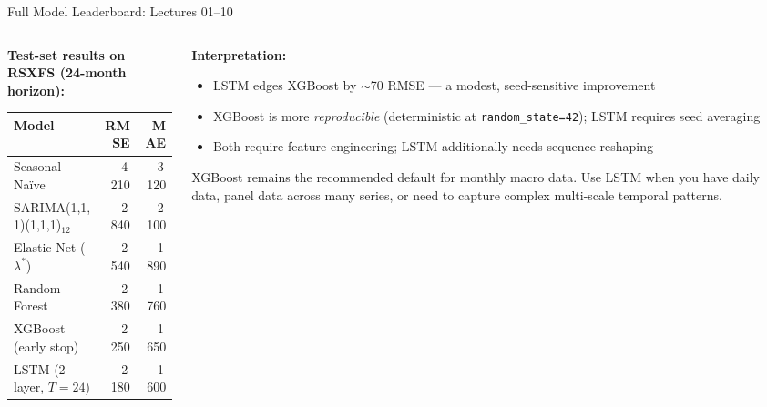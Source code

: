 \documentclass[aspectratio=169, 10pt]{beamer}
\begin{document}
\begin{frame}{Full Model Leaderboard: Lectures 01--10}
  \begin{columns}[T]
    \begin{column}{0.52\textwidth}
      \textbf{Test-set results on RSXFS (24-month horizon):}
      \begin{center}
      \footnotesize
      \begin{tabular}{lrr}
        \toprule
        \textbf{Model} & \textbf{RMSE} & \textbf{MAE} \\
        \midrule
        Seasonal Na\"{i}ve             & 4\,210 & 3\,120 \\
        SARIMA(1,1,1)(1,1,1)$_{12}$    & 2\,840 & 2\,100 \\
        Elastic Net ($\lambda^*$)      & 2\,540 & 1\,890 \\
        Random Forest                  & 2\,380 & 1\,760 \\
        XGBoost (early stop)           & 2\,250 & 1\,650 \\
        LSTM (2-layer, $T\!=\!24$)     & 2\,180 & 1\,600 \\
        \bottomrule
      \end{tabular}
      \end{center}
    \end{column}
    \begin{column}{0.44\textwidth}
      \textbf{Interpretation:}
      \begin{itemize}
        \item LSTM edges XGBoost by $\sim$70 RMSE --- a modest,
              seed-sensitive improvement
        \item XGBoost is more \emph{reproducible} (deterministic at
              \texttt{random\_state=42}); LSTM requires seed averaging
        \item Both require feature engineering; LSTM additionally
              needs sequence reshaping
      \end{itemize}

      \medskip
      \begin{keybox}
        \footnotesize
        XGBoost remains the recommended default for monthly macro data.
        Use LSTM when you have daily data, panel data across many
        series, or need to capture complex multi-scale temporal patterns.
      \end{keybox}
    \end{column}
  \end{columns}
\end{frame}
\end{document}
